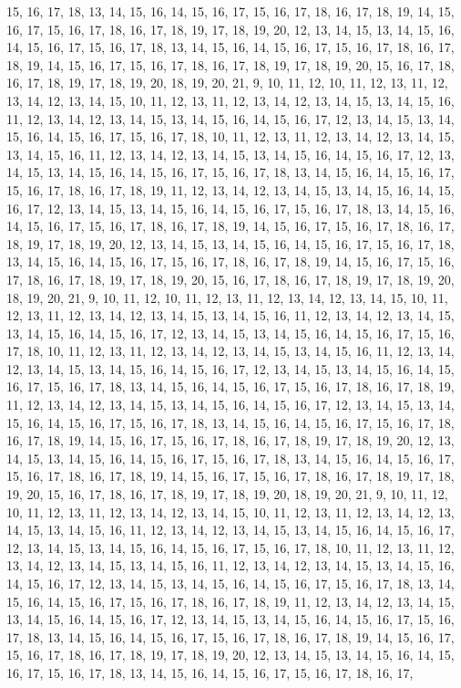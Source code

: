 15, 16, 17, 18, 13, 14, 15, 16, 14, 15, 16, 17, 15, 16, 17, 18, 16, 17, 18, 19, 14, 15, 16, 17, 15, 16, 17, 18, 16, 17, 18, 19, 17, 18, 19, 20, 12, 13, 14, 15, 13, 14, 15, 16, 14, 15, 16, 17, 15, 16, 17, 18, 13, 14, 15, 16, 14, 15, 16, 17, 15, 16, 17, 18, 16, 17, 18, 19, 14, 15, 16, 17, 15, 16, 17, 18, 16, 17, 18, 19, 17, 18, 19, 20, 15, 16, 17, 18, 16, 17, 18, 19, 17, 18, 19, 20, 18, 19, 20, 21, 9, 10, 11, 12, 10, 11, 12, 13, 11, 12, 13, 14, 12, 13, 14, 15, 10, 11, 12, 13, 11, 12, 13, 14, 12, 13, 14, 15, 13, 14, 15, 16, 11, 12, 13, 14, 12, 13, 14, 15, 13, 14, 15, 16, 14, 15, 16, 17, 12, 13, 14, 15, 13, 14, 15, 16, 14, 15, 16, 17, 15, 16, 17, 18, 10, 11, 12, 13, 11, 12, 13, 14, 12, 13, 14, 15, 13, 14, 15, 16, 11, 12, 13, 14, 12, 13, 14, 15, 13, 14, 15, 16, 14, 15, 16, 17, 12, 13, 14, 15, 13, 14, 15, 16, 14, 15, 16, 17, 15, 16, 17, 18, 13, 14, 15, 16, 14, 15, 16, 17, 15, 16, 17, 18, 16, 17, 18, 19, 11, 12, 13, 14, 12, 13, 14, 15, 13, 14, 15, 16, 14, 15, 16, 17, 12, 13, 14, 15, 13, 14, 15, 16, 14, 15, 16, 17, 15, 16, 17, 18, 13, 14, 15, 16, 14, 15, 16, 17, 15, 16, 17, 18, 16, 17, 18, 19, 14, 15, 16, 17, 15, 16, 17, 18, 16, 17, 18, 19, 17, 18, 19, 20, 12, 13, 14, 15, 13, 14, 15, 16, 14, 15, 16, 17, 15, 16, 17, 18, 13, 14, 15, 16, 14, 15, 16, 17, 15, 16, 17, 18, 16, 17, 18, 19, 14, 15, 16, 17, 15, 16, 17, 18, 16, 17, 18, 19, 17, 18, 19, 20, 15, 16, 17, 18, 16, 17, 18, 19, 17, 18, 19, 20, 18, 19, 20, 21, 9, 10, 11, 12, 10, 11, 12, 13, 11, 12, 13, 14, 12, 13, 14, 15, 10, 11, 12, 13, 11, 12, 13, 14, 12, 13, 14, 15, 13, 14, 15, 16, 11, 12, 13, 14, 12, 13, 14, 15, 13, 14, 15, 16, 14, 15, 16, 17, 12, 13, 14, 15, 13, 14, 15, 16, 14, 15, 16, 17, 15, 16, 17, 18, 10, 11, 12, 13, 11, 12, 13, 14, 12, 13, 14, 15, 13, 14, 15, 16, 11, 12, 13, 14, 12, 13, 14, 15, 13, 14, 15, 16, 14, 15, 16, 17, 12, 13, 14, 15, 13, 14, 15, 16, 14, 15, 16, 17, 15, 16, 17, 18, 13, 14, 15, 16, 14, 15, 16, 17, 15, 16, 17, 18, 16, 17, 18, 19, 11, 12, 13, 14, 12, 13, 14, 15, 13, 14, 15, 16, 14, 15, 16, 17, 12, 13, 14, 15, 13, 14, 15, 16, 14, 15, 16, 17, 15, 16, 17, 18, 13, 14, 15, 16, 14, 15, 16, 17, 15, 16, 17, 18, 16, 17, 18, 19, 14, 15, 16, 17, 15, 16, 17, 18, 16, 17, 18, 19, 17, 18, 19, 20, 12, 13, 14, 15, 13, 14, 15, 16, 14, 15, 16, 17, 15, 16, 17, 18, 13, 14, 15, 16, 14, 15, 16, 17, 15, 16, 17, 18, 16, 17, 18, 19, 14, 15, 16, 17, 15, 16, 17, 18, 16, 17, 18, 19, 17, 18, 19, 20, 15, 16, 17, 18, 16, 17, 18, 19, 17, 18, 19, 20, 18, 19, 20, 21, 9, 10, 11, 12, 10, 11, 12, 13, 11, 12, 13, 14, 12, 13, 14, 15, 10, 11, 12, 13, 11, 12, 13, 14, 12, 13, 14, 15, 13, 14, 15, 16, 11, 12, 13, 14, 12, 13, 14, 15, 13, 14, 15, 16, 14, 15, 16, 17, 12, 13, 14, 15, 13, 14, 15, 16, 14, 15, 16, 17, 15, 16, 17, 18, 10, 11, 12, 13, 11, 12, 13, 14, 12, 13, 14, 15, 13, 14, 15, 16, 11, 12, 13, 14, 12, 13, 14, 15, 13, 14, 15, 16, 14, 15, 16, 17, 12, 13, 14, 15, 13, 14, 15, 16, 14, 15, 16, 17, 15, 16, 17, 18, 13, 14, 15, 16, 14, 15, 16, 17, 15, 16, 17, 18, 16, 17, 18, 19, 11, 12, 13, 14, 12, 13, 14, 15, 13, 14, 15, 16, 14, 15, 16, 17, 12, 13, 14, 15, 13, 14, 15, 16, 14, 15, 16, 17, 15, 16, 17, 18, 13, 14, 15, 16, 14, 15, 16, 17, 15, 16, 17, 18, 16, 17, 18, 19, 14, 15, 16, 17, 15, 16, 17, 18, 16, 17, 18, 19, 17, 18, 19, 20, 12, 13, 14, 15, 13, 14, 15, 16, 14, 15, 16, 17, 15, 16, 17, 18, 13, 14, 15, 16, 14, 15, 16, 17, 15, 16, 17, 18, 16, 17, 